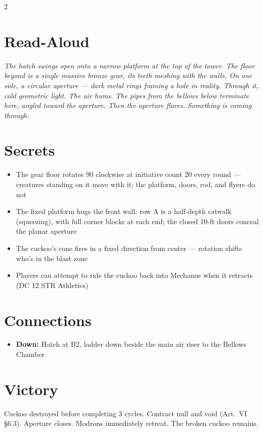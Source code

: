 \documentclass[10pt,letterpaper]{article}
\begin{document}
\begin{multicols}{2}

\section*{Read-Aloud}
\begin{readaloud}
\itshape
The hatch swings open onto a narrow platform at the top of the tower. The floor beyond is a single massive bronze gear, its teeth meshing with the walls. On one side, a circular aperture --- dark metal rings framing a hole in reality. Through it, cold geometric light. The air hums. The pipes from the bellows below terminate here, angled toward the aperture. Then the aperture flares. Something is coming through.
\end{readaloud}

\section*{Secrets}
\begin{itemize}
\item The gear floor rotates 90\textdegree{} clockwise at initiative count 20 every round --- creatures standing on it move with it; the platform, doors, rod, and flyers do not
\item The fixed platform hugs the front wall: row A is a half-depth catwalk (squeezing), with full corner blocks at each end; the closed 10-ft doors conceal the planar aperture
\item The cuckoo's cone fires in a fixed direction from center --- rotation shifts who's in the blast zone
\item Players can attempt to ride the cuckoo back into Mechanus when it retracts (DC 12 STR Athletics)
\end{itemize}

\section*{Connections}
\begin{itemize}
\item \textbf{Down:} Hatch at B2, ladder down beside the main air riser to the Bellows Chamber
\end{itemize}

\section*{Victory}
Cuckoo destroyed before completing 3 cycles. Contract null and void (Art.\ VI \S6.3). Aperture closes. Modrons immediately retreat. The broken cuckoo remains.


\end{multicols}
\end{document}

